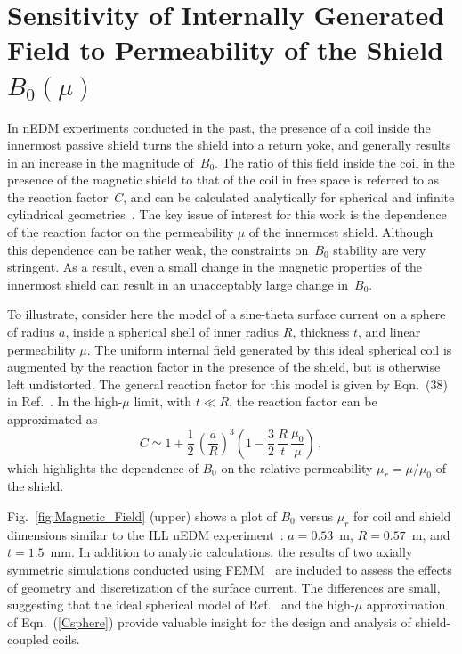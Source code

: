 

\section{Sensitivity of Internally Generated Field to Permeability of the Shield $B_0(\mu)$\label{sec:calculation}}

In nEDM experiments conducted in the past, the presence of a coil
inside the innermost passive shield turns the shield into a return
yoke, and generally results in an increase in the magnitude
of~$B_0$. The ratio of this field inside the coil in the presence of
the magnetic shield to that of the coil in free space is referred to
as the reaction factor~$C$, and can be calculated analytically for
spherical and infinite cylindrical
geometries~\cite{bidinosti2014passive,urankar1996design}. The key
issue of interest for this work is the dependence of the reaction
factor on the permeability $\mu$ of the innermost shield.  Although
this dependence can be rather weak, the constraints on~$B_0$ stability
are very stringent. As a result, even a small change in the magnetic
properties of the innermost shield can result in an unacceptably large
change in~$B_0$.


To illustrate, consider here the model of a sine-theta surface
current on a sphere of radius $a$, inside a spherical shell of inner
radius $R$, thickness $t$, and linear permeability $\mu$. The uniform
internal field generated by this ideal spherical coil is augmented by
the reaction factor in the presence of the shield, but is otherwise
left undistorted.  The general reaction factor for this model is given
by Eqn.~(38) in Ref.~\cite{bidinosti2014passive}.  In the high-$\mu$
limit, with $t\ll R$, the reaction factor can be approximated as
\begin{equation}
C 
 \simeq 1+ \frac{1}{2}\, \left( \frac{a}{R} \right)^{3} \left( 1- \frac{3}{2} \, \frac{R}{t} \, \frac{\mu_0}{\mu} \right) \, ,
 \label{Csphere}
\end{equation}
which highlights the dependence of $B_0$ on the relative permeability
$\mu_r=\mu/\mu_0$ of the shield.

Fig.~\ref{fig:Magnetic_Field} (upper) shows a plot of $B_0$ versus
$\mu_r$ for coil and shield dimensions similar to the ILL nEDM
experiment~\cite{Baker2006,knecht}: $a=0.53$~m, $R= 0.57$~m, and
$t=1.5$~mm.  In addition to analytic calculations, the results of two
axially symmetric simulations conducted using FEMM~\cite{femm} are
included to assess the effects of geometry and discretization of the
surface current. The differences are small, suggesting that the ideal
spherical model of Ref.~\cite{bidinosti2014passive} and the high-$\mu$
approximation of Eqn.~(\ref{Csphere}) provide valuable insight for the
design and analysis of shield-coupled coils.

